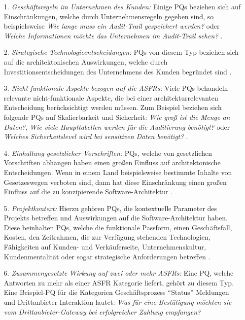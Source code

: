 \begin{itemize}
\item[1.] \textit{Gesch\"aftsregeln im Unternehmen des Kunden:} Einige PQs beziehen sich auf Einschr\"ankungen, welche durch Unternehmensregeln gegeben sind, so beispielsweise \textit{Wie lange muss ein Audit-Trail gespeichert werden?} oder \textit{Welche Informationen m\"ochte das Unternehmen im Audit-Trail sehen?} \cite{Ros02}.
\item[2.] \textit{Strategische Technologieentscheidungen:} PQs von diesem Typ beziehen sich auf die architektonischen Auswirkungen, welche durch Investitionsentscheidungen des Unternehmens des Kunden begr\"undet sind \cite{Ros02}.
\item[3.] \textit{Nicht-funktionale Aspekte bezogen auf die ASFRs:} Viele PQs behandeln relevante nicht-funktionale Aspekte, die bei einer architekturrelevanten Entscheidung ber\"ucksichtigt werden m\"ussen. Zum Beispiel beziehen sich folgende PQs auf Skalierbarkeit und Sicherheit: \textit{Wie gro\ss{} ist die Menge an Daten?}, \textit{Wie viele Haupttabellen werden f\"ur die Auditierung ben\"otigt?} oder \textit{Welches Sicherheitslevel wird bei sensitiven Daten ben\"otigt?} \cite{Ros02}.
\item[4.] \textit{Einhaltung gesetzlicher Vorschriften:} PQs, welche von gesetzlichen Vorschriften abh\"angen haben einen gro\ss{}en Einfluss auf architektonische Entscheidungen. Wenn in einem Land beispielsweise bestimmte Inhalte von Gesetzeswegen verboten sind, dann hat diese Einschr\"ankung einen gro\ss{}en Einfluss auf die zu konzipierende Software-Architektur \cite{Ros02}.
\item[5.] \textit{Projektkontext:} Hierzu geh\"oren PQs, die kontextuelle Parameter des Projekts betreffen und Auswirkungen auf die Software-Architektur haben. Diese beinhalten PQs, welche die funktionale Passform, einen Gesch\"aftsfall, Kosten, den Zeitrahmen, die zur Verf\"ugung stehenden Technologien, F\"ahigkeiten auf Kunden- und Verk\"auferseite, Unternehmenskultur, Kundenmentalit\"at oder sogar strategische Anforderungen betreffen \cite{Ros02}.
\item[6.] \textit{Zusammengesetzte Wirkung auf zwei oder mehr ASFRs:} Eine PQ, welche Antworten zu mehr als einer ASFR Kategorie liefert, geh\"ort zu diesem Typ. Eine Beispiel-PQ f\"ur die Kategorien Gesch\"aftsprozess  ``Status'' Meldungen und Drittanbieter-Interaktion lautet: \textit{Was f\"ur eine Best\"atigung m\"ochten sie vom Drittanbieter-Gateway bei erfolgreicher Zahlung empfangen?} \cite{Ros02} \\
\end{itemize}


